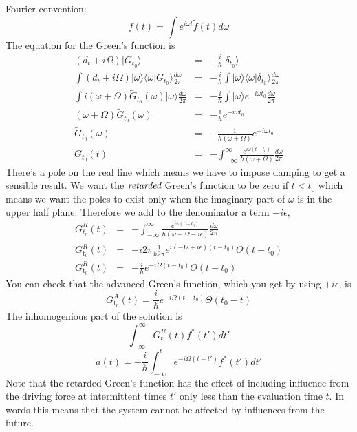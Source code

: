 Fourier convention: \begin{equation}
f(t)=\int e^{i\omega t}\tilde{f}(t)d\omega \end{equation}
The equation for the Green's function is \begin{eqnarray*}
\left(d_{t}+i\Omega\right)|G_{t_{0}}\rangle & = & -\frac{i}{\hbar}|\delta_{t_{0}}\rangle\\
\int\left(d_{t}+i\Omega\right)|\omega\rangle\langle\omega|G_{t_{0}}\rangle\frac{d\omega}{2\pi} & = & -\frac{i}{\hbar}\int|\omega\rangle\langle\omega|\delta_{t_{0}}\rangle\frac{d\omega}{2\pi}\\
\int i\left(\omega+\Omega\right)\tilde{G}_{t_{0}}(\omega)|\omega\rangle\frac{d\omega}{2\pi} & = & -\frac{i}{\hbar}\int|\omega\rangle e^{-i\omega t_{0}}\frac{d\omega}{2\pi}\\
\left(\omega+\Omega\right)\tilde{G}_{t_{0}}(\omega) & = & -\frac{1}{\hbar}e^{-i\omega t_{0}}\\
\tilde{G}_{t_{0}}(\omega) & = & -\frac{1}{\hbar\left(\omega+\Omega\right)}e^{-i\omega t_{0}}\\
G_{t_{0}}(t) & = & -\int_{-\infty}^{\infty}\frac{e^{i\omega(t-t_{0})}}{\hbar\left(\omega+\Omega\right)}\frac{d\omega}{2\pi}\end{eqnarray*}
There's a pole on the real line which means we have to impose damping to get a sensible result. We want the $\emph{retarded}$ Green's function to be zero if $t<t_{0}$ which means we want the poles to exist only when the imaginary part of $\omega$ is in the upper half plane. Therefore we add to the denominator a term $-i\epsilon$, \begin{eqnarray*}
G_{t_{0}}^{R}(t) & = & -\int_{-\infty}^{\infty}\frac{e^{i\omega(t-t_{0})}}{\hbar\left(\omega+\Omega-i\epsilon\right)}\frac{d\omega}{2\pi}\\
G_{\textrm{t}_{0}}^{R}(t) & = & -i2\pi\frac{1}{\hbar2\pi}e^{i(-\Omega+i\epsilon)(t-t_{0})}\Theta(t-t_{0})\\
G_{\textrm{t}_{0}}^{R}(t) & = & -\frac{i}{\hbar}e^{-i\Omega(t-t_{0})}\Theta(t-t_{0}) \end{eqnarray*}
You can check that the advanced Green's function, which you get by using $+i\epsilon$, is \begin{equation}
G_{\textrm{t}_{0}}^{A}(t)=\frac{i}{\hbar}e^{-i\Omega(t-t_{0})}\Theta(t_{0}-t) \end{equation}
The inhomogenious part of the solution is \begin{equation}
\int_{-\infty}^{\infty}G_{t'}^{R}(t)f^{*}(t')dt' \end{equation}
\begin{equation}
a(t)=-\frac{i}{\hbar}\int_{-\infty}^{t}e^{-i\Omega(t-t')}f^{*}(t')dt' \end{equation}
Note that the retarded Green's function has the effect of including influence from the driving force at intermittent times $t'$ only less than the evaluation time $t$. In words this means that the system cannot be affected by influences from the future.

